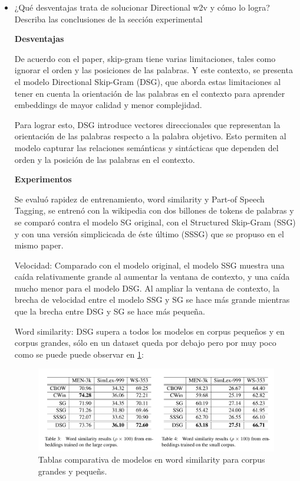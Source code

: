 \documentclass[letter, 11pt, twoside]{report}
\begin{document}
\begin{itemize}
  \item ¿Qué desventajas trata de solucionar Directional w2v y cómo lo logra? Describa las conclusiones de la sección experimental
  
  \textbf{Desventajas}

  De acuerdo con el paper, skip-gram tiene varias limitaciones, tales como ignorar el orden y las posiciones de las palabras.
  Y este contexto, se presenta el modelo Directional Skip-Gram (DSG), que aborda estas limitaciones al tener en cuenta la orientación de las palabras en el contexto para aprender embeddings de mayor calidad y menor complejidad.

  Para lograr esto, DSG introduce vectores direccionales que representan la orientación de las palabras respecto a la palabra objetivo. Esto permiten al modelo capturar las relaciones semánticas y sintácticas que dependen del orden y la posición de las palabras en el contexto.

  \textbf{Experimentos}

  Se evaluó rapidez de entrenamiento, word similarity y Part-of Speech Tagging, se entrenó con la wikipedia con dos billones de tokens de palabras y se comparó contra el modelo SG original, con el Structured Skip-Gram (SSG) y con una versión simplicicada de éste último (SSSG) que se propuso en el mismo paper.

  Velocidad: Comparado con el modelo original, el modelo SSG muestra una caída relativamente grande al aumentar la ventana de contexto, y una caída mucho menor para el modelo DSG. Al ampliar la ventana de contexto, la brecha de velocidad entre el modelo SSG y SG se hace más grande mientras que la brecha entre DSG y SG se hace más pequeña.

  Word similarity: DSG supera a todos los modelos en corpus pequeños y en corpus grandes, sólo en un dataset queda por debajo pero por muy poco como se puede puede observar en \ref{dsg}:


  \begin{figure}[H]
    \begin{center}
      \includegraphics[scale=0.22]{dsg.jpg}
      \caption{Tablas comparativa de modelos en word similarity para corpus grandes y pequeñs.}
      \label{dsg}
    \end{center}
  \end{figure}


\end{itemize}
\end{document}
